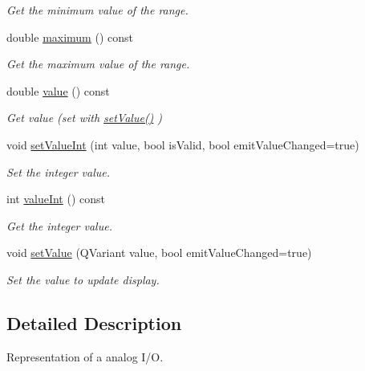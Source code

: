 \begin{DoxyCompactItemize}
\begin{DoxyCompactList}\small\item\em Get the minimum value of the range. \end{DoxyCompactList}\item 
\hypertarget{classmdt_analog_io_a61e312bc7921a6ca097ea6babf3281a5}{
double \hyperlink{classmdt_analog_io_a61e312bc7921a6ca097ea6babf3281a5}{maximum} () const }
\label{classmdt_analog_io_a61e312bc7921a6ca097ea6babf3281a5}

\begin{DoxyCompactList}\small\item\em Get the maximum value of the range. \end{DoxyCompactList}\item 
\hypertarget{classmdt_analog_io_a55d3e346dd13a580dc4ac77e8e946b01}{
double \hyperlink{classmdt_analog_io_a55d3e346dd13a580dc4ac77e8e946b01}{value} () const }
\label{classmdt_analog_io_a55d3e346dd13a580dc4ac77e8e946b01}

\begin{DoxyCompactList}\small\item\em Get value (set with \hyperlink{classmdt_analog_io_a3c8a10c66650728d1878415032543e8a}{setValue()} ) \end{DoxyCompactList}\item 
void \hyperlink{classmdt_analog_io_a011fba645b655bdb3f7f8740c327e624}{setValueInt} (int value, bool isValid, bool emitValueChanged=true)
\begin{DoxyCompactList}\small\item\em Set the integer value. \end{DoxyCompactList}\item 
int \hyperlink{classmdt_analog_io_a7594e94e059dd3b1db9d8277c7426fb2}{valueInt} () const 
\begin{DoxyCompactList}\small\item\em Get the integer value. \end{DoxyCompactList}\item 
void \hyperlink{classmdt_analog_io_a3c8a10c66650728d1878415032543e8a}{setValue} (QVariant value, bool emitValueChanged=true)
\begin{DoxyCompactList}\small\item\em Set the value to update display. \end{DoxyCompactList}\end{DoxyCompactItemize}


\subsection{Detailed Description}
Representation of a analog I/O. 

